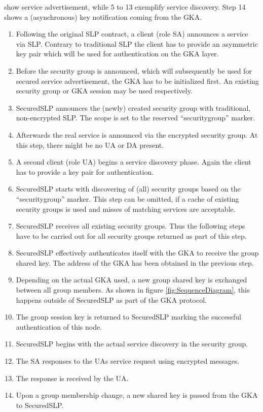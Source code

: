 show service advertisement, while 5 to 13
exemplify service discovery. Step 14 shows a
(asynchronous) key notification coming from
the GKA. \begin{enumerate}[label=\arabic{*}:]
  \item Following the original SLP contract, a client (role SA) announces a
  service via SLP. Contrary to traditional SLP the client has to provide an
  asymmetric key pair which will be used for authentication on the GKA layer.
  \item Before the security group is announced, which will subsequently be used for secured service advertisement, the GKA has to be
  initialized first. An existing security group or GKA session may be used
  respectively.
  \item SecuredSLP announces the (newly) created security group with
  traditional, non-encrypted SLP. The scope is set to the reserved
  ``securitygroup'' marker.
  \item Afterwards the real service is announced via the encrypted security
  group. At this step, there might be no UA or DA present.
  \item A second client (role UA) begins a service discovery phase. Again the
  client has to provide a key pair for authentication.
  \item SecuredSLP starts with discovering of (all) security groups based on
  the ``securitygroup'' marker. This step can be omitted, if a cache of
  existing security groups is used and misses of matching services are
  acceptable.
  \item SecuredSLP receives all existing security groups. Thus the following
  steps have to be carried out for all security groups returned as part of this
  step.
  \item SecuredSLP effectively authenticates itself with the GKA to receive
  the group shared key. The address of the GKA has been obtained in the previous
  step.
  \item Depending on the actual GKA used, a new group shared key is exchanged
  between all group members. As shown in figure \ref{fig:SequenceDiagram}, this
  happens outside of SecuredSLP as part of the GKA protocol.
  \item The group session key is returned to SecuredSLP marking the successful
  authentication of this node.
  \item SecuredSLP begins with the actual service discovery in the security
  group.
  \item The SA responses to the UAs service request using encrypted messages.
  \item The response is received by the UA.
  \item Upon a group membership change, a new shared key is passed from the GKA
  to SecuredSLP.
\end{enumerate}
